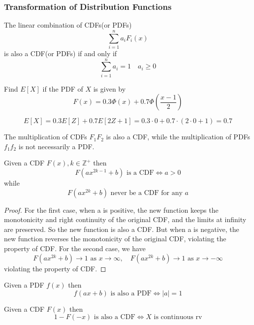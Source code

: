 \documentclass{template}
\begin{document}
\subsubsection{Transformation of Distribution Functions}

\begin{theorem}
The linear combination of CDFs(or PDFs)
\[ \sum_{i=1}^{n} a_i F_i(x) \]
is also a CDF(or PDFs) if and only if 
\[
	\sum_{i=1}^{n} a_i = 1 \quad a_i \geq 0
\]
\end{theorem}

\begin{example}
	Find $E[X]$ if the PDF of $X$ is given by
	 \[
		 F(x) = 0.3\Phi(x) + 0.7\Phi\left(\frac{x-1}{2}\right)
	\] 
	\begin{answer}
		\[
			E[X] = 0.3E[Z] + 0.7E[2Z+1] = 0.3\cdot 0 + 0.7\cdot (2\cdot 0 + 1) = 0.7
		\] 
	\end{answer}
\end{example}

\begin{theorem}
The multiplication of CDFs $F_1F_2$ is also a CDF, while the multiplication of PDFs
 $f_1f_2$ is not necessarily a PDF.
\end{theorem}

\begin{theorem}
	Given a CDF \( F(x) ,  k \in \mathbb{Z}^{+}\) then
	\[
		F(ax^{2k-1}+b) \text{ is a CDF} \iff a>0
	\] 
	while
	\[
		F(ax^{2k}+b) \text{ never be a CDF for any } a
	\] 
	\begin{proof}
		For the first case, when a is positive, the new function keeps the monotonicity
		and right continuity of the original CDF, and the limits at infinity are preserved.
		So the new function is also a CDF.
		But when a is negative, the new function reverses the monotonicity of the original CDF,
		violating the property of CDF.
		For the second case, we have
		\[
			F(ax^{2k}+b) \to 1 \text{ as } x \to \infty, \quad F(ax^{2k}+b) \to 1 \text{ as } x \to -\infty
		\] 
		violating the property of CDF.
	\end{proof}
\end{theorem}
\begin{theorem}
	Given a PDF \( f(x) \) then
	\[
		f(ax+b) \text{ is also a PDF} \iff |a|=1
	\] 
\end{theorem}

\begin{theorem}
	Given a CDF \( F(x) \) then
	\[
		1-F(-x) \text{ is also a CDF} \iff X \text{ is continuous rv}
	\] 
\end{theorem}
\end{document}
